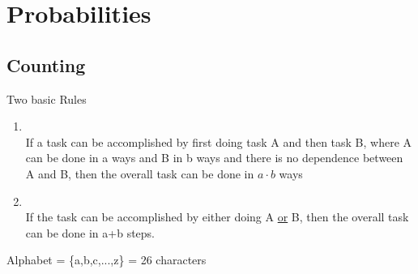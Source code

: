 \documentclass[12pt,a4paper]{article}
\begin{document}
\section{Probabilities}
\subsection{Counting}
Two basic Rules
\begin{enumerate}
	\item {} \\
	If a task can be accomplished by first doing task A and then task B, where A can be done in a ways and B in b ways and there is no dependence between A and B, then the overall task can be done in $a\cdot b$ ways
	\item {}\\
	If the task can be accomplished by either doing A \underline{or} B, then the overall task can be done in a+b steps.
\end{enumerate}
Alphabet = \{a,b,c,...,z\} = 26 characters
\end{document}

